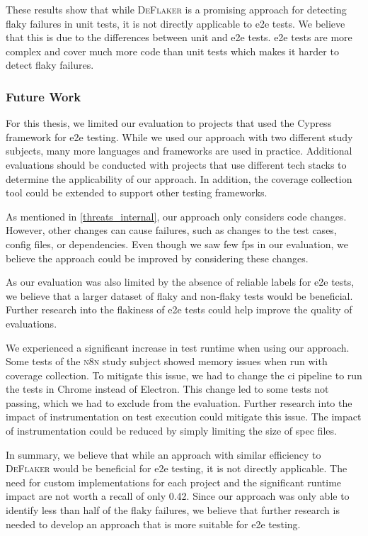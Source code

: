These results show that while \textsc{DeFlaker} is a promising approach for detecting flaky failures in unit tests, it is not directly applicable to \ac{e2e} tests.
We believe that this is due to the differences between unit and \ac{e2e} tests.
\Ac{e2e} tests are more complex and cover much more code than unit tests which makes it harder to detect flaky failures.

\subsubsection{Future Work}
For this thesis, we limited our evaluation to projects that used the Cypress framework for \ac{e2e} testing.
While we used our approach with two different study subjects, many more languages and frameworks are used in practice.
Additional evaluations should be conducted with projects that use different tech stacks to determine the applicability of our approach.
In addition, the coverage collection tool could be extended to support other testing frameworks.

As mentioned in \cref{threats_internal}, our approach only considers code changes.
However, other changes can cause failures, such as changes to the test cases, config files, or dependencies.
Even though we saw few \aclp{fp} in our evaluation, we believe the approach could be improved by considering these changes.

As our evaluation was also limited by the absence of reliable labels for \ac{e2e} tests, we believe that a larger dataset of flaky and non-flaky tests would be beneficial.
Further research into the flakiness of \ac{e2e} tests could help improve the quality of evaluations.

We experienced a significant increase in test runtime when using our approach.
Some tests of the \textsc{n8n} study subject showed memory issues when run with coverage collection.
To mitigate this issue, we had to change the \ac{ci} pipeline to run the tests in Chrome instead of Electron.
This change led to some tests not passing, which we had to exclude from the evaluation.
Further research into the impact of instrumentation on test execution could mitigate this issue.
The impact of instrumentation could be reduced by simply limiting the size of spec files.

In summary, we believe that while an approach with similar efficiency to \textsc{DeFlaker} would be beneficial for \ac{e2e} testing, it is not directly applicable.
The need for custom implementations for each project and the significant runtime impact are not worth a recall of only \num{0.42}.
Since our approach was only able to identify less than half of the flaky failures, we believe that further research is needed to develop an approach that is more suitable for \ac{e2e} testing.


